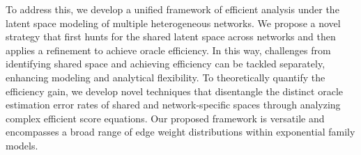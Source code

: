 \documentclass[12pt]{article}
\begin{document}
To address this, we develop a unified framework of efficient analysis  under  the latent space modeling of multiple heterogeneous networks.  
We propose a novel strategy that first hunts for the shared latent space across networks and then applies a  refinement to achieve oracle efficiency. 
In this way, challenges from identifying shared space and achieving efficiency can be tackled separately, enhancing modeling and analytical flexibility.   
To theoretically quantify the efficiency gain, 
we develop novel techniques that  
disentangle the distinct oracle estimation error rates of shared and network-specific spaces through analyzing complex efficient score equations.  
Our proposed framework is versatile and encompasses  a broad range of edge weight distributions within exponential family models.  


\end{document}
